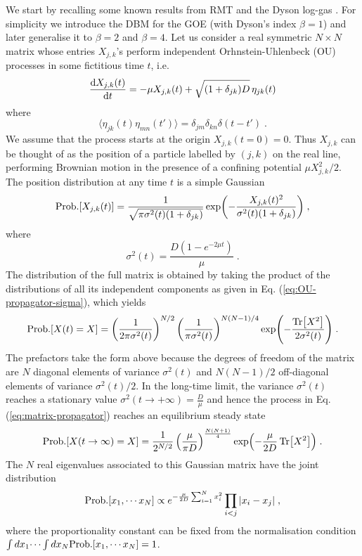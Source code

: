 \documentclass[onecolumn,superscriptaddress,
 amsmath,amssymb,
 aps,
 prd,
]{revtex4-1}
\newcommand{\bea}{\begin{eqnarray}}
\newcommand{\eea}{\end{eqnarray}}
\begin{document}
\vspace*{0.5cm}
 We start by recalling some known results from RMT and the Dyson log-gas \cite{D62}. 
For simplicity we introduce the DBM for the GOE (with Dyson's index $\beta = 1$) and later generalise it to $\beta=2$ and $\beta = 4$. Let us consider a real symmetric $N \times N$ matrix whose entries $X_{j,k}$'s perform independent Orhnstein-Uhlenbeck (OU) processes in some fictitious time $t$, i.e.
{
\begin{equation} \label{eq:dynamics-GUE}
\dv{X_{j, k}(t)}{t} = - \mu X_{j, k}(t) + \sqrt{(1 + \delta_{jk}) D } \, \eta_{jk}(t)
\end{equation}
}
where 
{
\begin{equation}\label{eq:eta-mu-def}
\langle \eta_{jk}(t) \eta_{mn}(t') \rangle = \delta_{jm} \delta_{kn} \delta(t - t') \;.
\end{equation}
We assume that the process starts at the origin $X_{j,k}(t=0)=0$. Thus $X_{j,k}$ can be thought of as the position of a particle labelled by $(j,k)$ on the real line, performing Brownian motion in the presence of a confining potential $\mu X_{j,k}^2/2$. The position distribution at any time $t$ is a simple Gaussian
\begin{equation} \label{eq:OU-propagator-sigma}
{\rm Prob.}[X_{j,k}(t)] = \frac{1}{\sqrt{\pi \sigma^2(t) (1 + \delta_{jk})}} \exp( - \frac{X_{j,k}(t)^2}{\sigma^2(t) (1 + \delta_{jk})} ) \;,
\end{equation} 
where 
\begin{equation} \label{eq:def-sigma}
\sigma^2(t) = \frac{D (1 - e^{-2 \mu t})}{\mu} \;.
\end{equation}
The distribution of the full matrix is obtained by taking the product of the distributions of all its independent components as given in Eq. (\ref{eq:OU-propagator-sigma}), which yields
\begin{equation} \label{eq:matrix-propagator}
{\rm Prob.}[X(t) = X] = \left( \frac{1}{2 \pi \sigma^2(t)} \right)^{N/2} \left(\frac{1}{\pi \sigma^2(t)} \right)^{N(N-1)/4} \exp( - \frac{\Tr[X^2]}{2 \sigma^2(t)} ) \;.
\end{equation}
The prefactors take the form above because the degrees of freedom of the matrix are $N$ diagonal elements of variance $\sigma^2(t)$ and $N(N-1)/2$ off-diagonal elements of variance $\sigma^2(t)/2$. In the long-time limit, the variance $\sigma^2(t)$ reaches a stationary value $\sigma^2(t \to +\infty) = \frac{D}{\mu}$ and hence the process in Eq. (\ref{eq:matrix-propagator}) reaches an equilibrium steady state
\begin{equation} \label{eq:matrix-ss}
{\rm Prob.}[X(t \to \infty) = X] = \frac{1}{2^{N/2}} \left( \frac{\mu}{\pi D}\right)^{\frac{N(N+1)}{4}} \exp( - \frac{\mu}{2D} \Tr[X^2]  ) \;.
\end{equation}
}
The $N$ real eigenvalues associated to this Gaussian matrix have the joint distribution~\cite{M91,F10} 
\bea \label{P_joint_Xeq_GOE}
{\rm Prob.}[x_1, \cdots x_N] \propto e^{- \frac{\mu}{2D} \sum_{i=1}^N x_i^2} \prod_{i<j} |x_i - x_j| \;,
\eea
where the proportionality constant can be fixed from the normalisation condition $\int dx_1 \dots \int dx_N {\rm Prob.}[x_1, \cdots x_N] =1$. 
\end{document}
